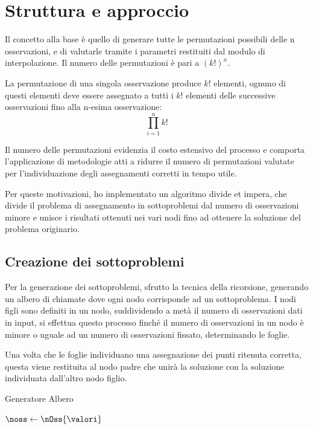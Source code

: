 \documentclass[a4paper,12pt]{report}
\begin{document}
\section{Struttura e approccio}
\label{s:struttura}
Il concetto alla base è quello di generare tutte le permutazioni possibili delle n osservazioni, e di valutarle tramite i parametri restituiti dal modulo di interpolazione. Il numero delle permutazioni è pari a $(k!)^{n}$.

La permutazione di una singola osservazione produce $k!$ elementi, ognuno di questi elementi deve essere assegnato a tutti i $k!$ elementi delle successive osservazioni fino alla n-esima osservazione:
\begin{equation}
 \label{numPerm}
  \prod_{i=1}^{n}k!
\end{equation}

Il numero delle permutazioni evidenzia il costo estensivo del processo e comporta l'applicazione di metodologie atti a ridurre il numero di permutazioni valutate per l'individuazione degli assegnamenti corretti in tempo utile.

Per queste motivazioni, ho implementato un algoritmo divide et impera, che divide il problema di assegnamento in sottoproblemi dal numero di osservazioni minore e unisce i risultati ottenuti nei vari nodi fino ad ottenere la soluzione del problema originario.

\subsection{Creazione dei sottoproblemi}

  Per la generazione dei sottoproblemi, sfrutto la tecnica della ricorsione, generando un albero di chiamate dove ogni nodo corrisponde ad un sottoproblema.
  I nodi figli sono definiti in un nodo, suddividendo a metà il numero di osservazioni dati in input, si effettua questo processo finché il numero di osservazioni in un nodo è minore o uguale ad un numero di osservazioni fissato, determinando le foglie.

  Una volta che le foglie individuano una assegnazione dei punti ritenuta corretta, questa viene restituita al nodo padre che unirà la soluzione con la soluzione individuata dall'altro nodo figlio.
  \begin{algorithm}
  \caption{Generatore Albero}\label{alg:genera_albero}
  $\noss \leftarrow \nOss{\valori}$ \\
  \Return {} \\

  \end{algorithm}
\end{document}
